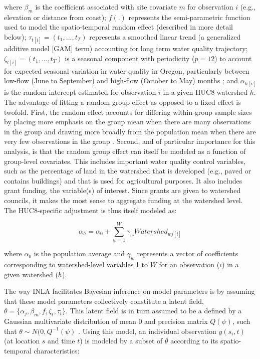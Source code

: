\documentclass[11pt,a4paper,titlepage]{article}
\begin{document}
where $\beta_{m}$ is the coefficient associated with site covariate $m$ for observation $i$ (e.g., elevation or distance from coast); $f(.)$ represents the semi-parametric function used to model the spatio-temporal random effect (described in more detail below); $\tau_{t[i]}=(t_1,...,t_T)$ represents a smoothed linear trend (a generalized additive model [GAM] term) accounting for long term water quality trajectory;  $\zeta_{t[i]} = (t_1,...,t_T)$ is a seasonal component with periodicity ($p=12$) to account for expected seasonal variation in water quality in Oregon, particularly between low-flow (June to September) and high-flow (October to May) months \parencite{cude2001}; and $\alpha_{h[i]}$ is the random intercept estimated for observation $i$ in a given HUC8 watershed $h$. The advantage of fitting a random group effect as opposed to a fixed effect is twofold. First, the random effect accounts for differing within-group sample sizes by placing more emphasis on the group mean when there are many observations in the group and drawing more broadly from the population mean when there are very few observations in the group \parencite{gelman2006,gelman2013}. Second, and of particular importance for this analysis, is that the random group effect can itself be modeled as a function of group-level covariates. This includes important water quality control variables, such as the percentage of land in the watershed that is developed (e.g., paved or contains buildings) and that is used for agricultural purposes. It also includes grant funding, the variable(s) of interest. Since grants are given to watershed councils, it makes the most sense to aggregate funding at the watershed level. The HUC8-specific adjustment is thus itself modeled as:

\begin{equation}
\alpha_{h} = \alpha_{0} + \sum_{w=1}^{W}\gamma_{w}Watershed_{wj[i]}
\label{eq:huc8level}
\end{equation}

where $\alpha_0$ is the population average and $\gamma_w$ represents a vector of coefficients corresponding to watershed-level variables 1 to $W$ for an observation ($i$) in a given watershed ($h$). 

The way INLA facilitates Bayesian inference on model parameters is by assuming that these model parameters collectively constitute a latent field, $\theta = \{\alpha_j,\beta_m,f,\zeta_t,\tau_t\}$. This latent field is in turn assumed to be a defined by a Gaussian multivariate distribution of mean 0 and precision matrix $Q(\psi)$, such that $\theta \sim N(0,Q^{-1}(\psi)$ \parencite{blangiardo2013,rue2005,rue2009,cosandey-godin2014}. Using this model, an individual observation $y(s_i,t)$ (at location $s$ and time $t$) is modeled by a subset of $\theta$ according to its spatio-temporal characteristics:
\end{document}
